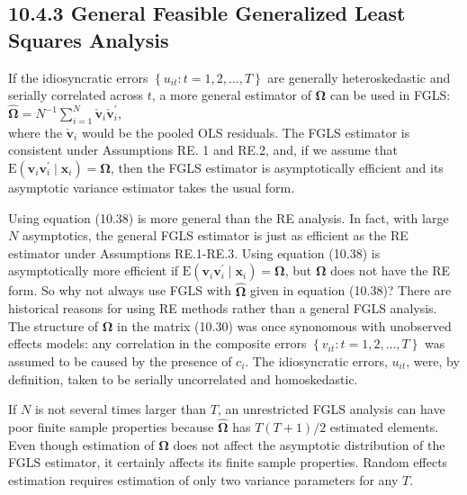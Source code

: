 \documentclass[10pt]{article}
\begin{document}
\subsection*{10.4.3 General Feasible Generalized Least Squares Analysis}
If the idiosyncratic errors $\left\{u_{i t}: t=1,2, \ldots, T\right\}$ are generally heteroskedastic and serially correlated across $t$, a more general estimator of $\boldsymbol{\Omega}$ can be used in FGLS:\\
$\hat{\boldsymbol{\Omega}}=N^{-1} \sum_{i=1}^{N} \check{\mathbf{v}}_{i} \check{\mathbf{v}}_{i}^{\prime}$,\\
where the $\check{\mathbf{v}}_{i}$ would be the pooled OLS residuals. The FGLS estimator is consistent under Assumptions RE. 1 and RE.2, and, if we assume that $\mathrm{E}\left(\mathbf{v}_{i} \mathbf{v}_{i}^{\prime} \mid \mathbf{x}_{i}\right)=\boldsymbol{\Omega}$, then the FGLS estimator is asymptotically efficient and its asymptotic variance estimator takes the usual form.

Using equation (10.38) is more general than the RE analysis. In fact, with large $N$ asymptotics, the general FGLS estimator is just as efficient as the RE estimator under Assumptions RE.1-RE.3. Using equation (10.38) is asymptotically more efficient if $\mathrm{E}\left(\mathbf{v}_{i} \mathbf{v}_{i}^{\prime} \mid \mathbf{x}_{i}\right)=\boldsymbol{\Omega}$, but $\boldsymbol{\Omega}$ does not have the RE form. So why not always use FGLS with $\hat{\boldsymbol{\Omega}}$ given in equation (10.38)? There are historical reasons for using RE methods rather than a general FGLS analysis. The structure of $\boldsymbol{\Omega}$ in the matrix (10.30) was once synonomous with unobserved effects models: any correlation in the composite errors $\left\{v_{i t}: t=1,2, \ldots, T\right\}$ was assumed to be caused by the presence of $c_{i}$. The idiosyncratic errors, $u_{i t}$, were, by definition, taken to be serially uncorrelated and homoskedastic.

If $N$ is not several times larger than $T$, an unrestricted FGLS analysis can have poor finite sample properties because $\hat{\boldsymbol{\Omega}}$ has $T(T+1) / 2$ estimated elements. Even though estimation of $\boldsymbol{\Omega}$ does not affect the asymptotic distribution of the FGLS estimator, it certainly affects its finite sample properties. Random effects estimation requires estimation of only two variance parameters for any $T$.
\end{document}
